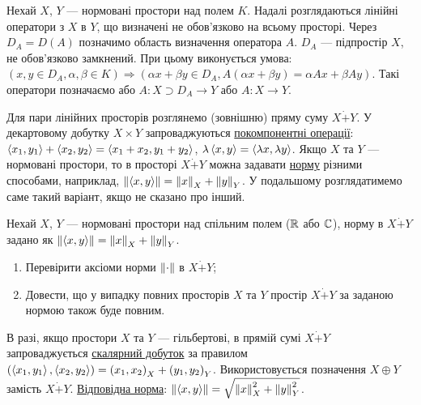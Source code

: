 
\begin{theory}
    Нехай $X$, $Y$ --- нормовані простори над полем $K$. Надалі розглядаються лінійні оператори
    з $X$ в $Y$, що визначені не обов'язково на всьому просторі.
    Через $D_A = D(A)$ позначимо область визначення оператора $A$.
    $D_A$ --- підпростір $X$, не обов'язково замкнений. При цьому виконується умова:
    $\left( x, y \in D_A, \alpha, \beta \in K\right) \Rightarrow \left( \alpha x + \beta y \in D_A, A(\alpha x + \beta y) = \alpha Ax + \beta Ay\right)$.
    Такі оператори позначаємо або $A : X \supset D_A \to Y$ або $A : X \to Y$.

    \noindent Для пари лінійних просторів розглянемо (зовнішню) пряму суму $X \dot{+} Y$.
    У декартовому добутку $X \times Y$ запроваджуються \ul{покомпонентні операції}:
    $\left\langle x_1, y_1\right\rangle + \left\langle x_2, y_2\right\rangle = \left\langle x_1 + x_2, y_1 + y_2\right\rangle$, $\lambda \left\langle x, y\right\rangle = \left\langle\lambda x, \lambda y\right\rangle$.
    Якщо $X$ та $Y$ --- нормовані простори, то в просторі $X \dot{+} Y$ можна задавати \ul{норму} різними способами, наприклад, 
    $\left\lVert\left\langle x, y\right\rangle\right\rVert = \left\lVert x\right\rVert_X + \left\lVert y\right\rVert_Y$. У подальшому розглядатимемо саме такий варіант, якщо не сказано про інший.
\end{theory}

\begin{exercise}
    Нехай $X$, $Y$ --- нормовані простори над спільним полем ($\mathbb{R}$ або $\mathbb{C}$), норму в $X \dot{+} Y$ задано як $\left\lVert\left\langle x, y\right\rangle\right\rVert = \left\lVert x\right\rVert_X + \left\lVert y\right\rVert_Y$.
    \begin{enumerate}
        \item Перевірити аксіоми норми $\left\lVert\cdot\right\rVert$ в $X \dot{+} Y$;
        \item Довести, що у випадку повних просторів $X$ та $Y$ простір $X \dot{+} Y$ за заданою нормою також буде повним.
    \end{enumerate}
\end{exercise}

\begin{theory}
    В разі, якщо простори $X$ та $Y$ --- гільбертові, в прямій сумі $X \dot{+} Y$ запроваджується
    \ul{скалярний добуток} за правилом $\left(\left\langle x_1, y_1\right\rangle, \left\langle x_2, y_2\right\rangle\right) = \left(x_1, x_2\right)_X + \left(y_1, y_2\right)_Y$.
    Використовується позначення $X \oplus Y$ замість $X \dot{+} Y$.
    \ul{Відповідна норма}: $\left\lVert\left\langle x, y\right\rangle\right\rVert = \sqrt{\left\lVert x\right\rVert_X^2 + \left\lVert y\right\rVert_Y^2}$.
\end{theory}

